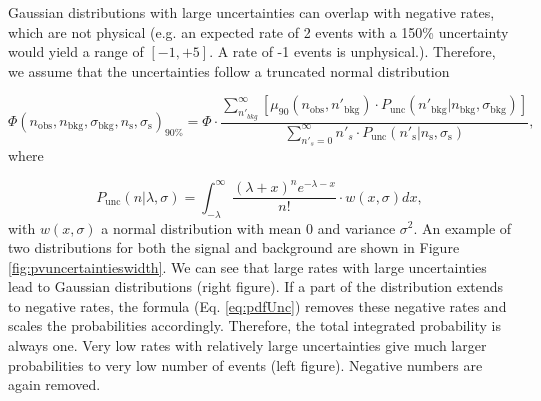 Gaussian distributions with large uncertainties can overlap with negative rates, which are not physical (e.g. an expected rate of 2 events with a 150\% uncertainty would yield a range of $\left[-1,+5\right]$. A rate of -1 events is unphysical.). Therefore, we assume that the uncertainties follow a truncated normal distribution 

\begin{equation}
\label{eq:finalUL}
\Phi(n_\textrm{obs}, n_\textrm{bkg}, \sigma_{\textrm{bkg}}, n_\textrm{s}, \sigma_{\textrm{s}} )_{90\%} = \Phi \cdot \frac{\sum^\infty_{n'_{bkg}} \left[ \mu_{90}\left(n_\textrm{obs},n'_\textrm{bkg} \right) \cdot P_\textrm{unc} \left(n'_\textrm{bkg}|n_\textrm{bkg},\sigma_{\textrm{bkg}}\right) \right]}{\sum^\infty_{n'_s = 0} n'_s \cdot P_\textrm{unc}\left(n'_\textrm{s} | n_\textrm{s}, \sigma_{\textrm{s}}\right)},
\end{equation}
where

\begin{equation}
\label{eq:pdfUnc}
P_\textrm{unc}\left(n|\lambda, \sigma \right) = \int^\infty_{-\lambda} \frac{\left(\lambda + x\right)^n e^{-\lambda-x}}{n!} \cdot w(x,\sigma)dx,
\end{equation}
with $w(x,\sigma)$ a normal distribution with mean 0 and variance $\sigma^2$. An example of two distributions for both the signal and background are shown in Figure \ref{fig:pvuncertaintieswidth}. We can see that large rates with large uncertainties lead to Gaussian distributions (right figure). If a part of the distribution extends to negative rates, the formula (Eq. \ref{eq:pdfUnc}) removes these negative rates and scales the probabilities accordingly. Therefore, the total integrated probability is always one. Very low rates with relatively large uncertainties give much larger probabilities to very low number of events (left figure). Negative numbers are again removed.

